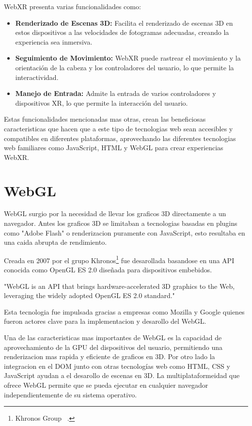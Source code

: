 \documentclass[a4paper, 12pt]{book}
\let\cleardoublepage\clearpage
\begin{document}
WebXR presenta varias funcionalidades como: 

\begin{itemize}
  
  \item \textbf{Renderizado de Escenas 3D:} Facilita el renderizado de escenas 3D en estos dispositivos a las velocidades de fotogramas adecuadas, creando la experiencia sea inmersiva.
  
  \item \textbf{Seguimiento de Movimiento:} WebXR puede rastrear el movimiento y la orientación de la cabeza y los controladores del usuario, lo que permite la interactividad.
  
  \item \textbf{Manejo de Entrada:} Admite la entrada de varios controladores y dispositivos XR, lo que permite la interacción del usuario.

\end{itemize}
Estas funcionalidades mencionadas mas otras, crean las beneficiosas caracteristicas que hacen que a este tipo de tecnologias web sean accesibles y compatibles en diferentes plataformas, aprovechando las diferentes tecnologias web familiares como JavaScript, HTML y WebGL para crear experiencias WebXR.

\cleardoublepage
\section{WebGL} 
\label{sec:seccion5}

WebGL surgio por la necesidad de llevar los graficos 3D directamente a un navegador. Antes los graficos 3D se limitaban a tecnologias basadas en plugins como "Adobe Flash" o renderizacion puramente con JavaScript, esto resultaba en una caida abrupta de rendimiento.

Creada en 2007 por el grupo Khronos\footnote{Khronos Group  ~\cite{webgl-khronos}.} fue desarollada basandose en una API conocida como OpenGL ES 2.0 diseñada para dispositivos embebidos.

"WebGL is an API that brings hardware-accelerated 3D graphics to the Web, leveraging the widely adopted OpenGL ES 2.0 standard." \cite{webgl-khronos}

Esta tecnologia fue impulsada gracias a empresas como Mozilla y Google quienes fueron actores clave para la implementacion y desarollo del WebGL.

Una de las caracteristicas mas importantes de WebGL es la capacidad de aprovechamiento de la GPU del dispositivos del usuario, permitiendo una renderizacion mas rapida y eficiente de graficos en 3D. Por otro lado la integracion en el DOM junto con otras tecnologías web como HTML, CSS y JavaScript ayudan a el desarollo de escenas en 3D. La multiplataformeidad que ofrece WebGL permite que se pueda ejecutar en cualquier navegador independientemente de su sistema operativo.
\cleardoublepage
\end{document}
